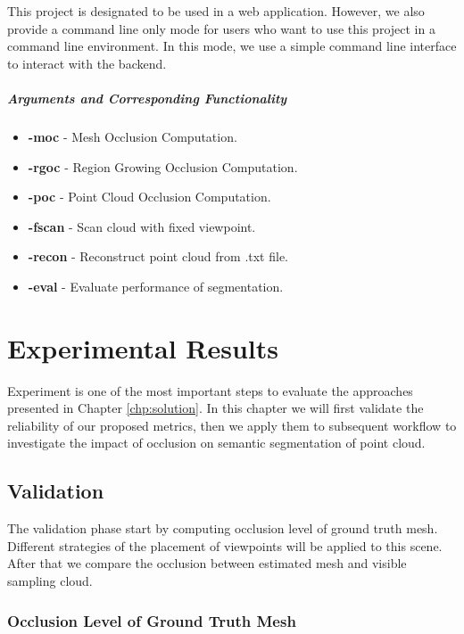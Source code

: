 \documentclass[11pt, a4paper,oneside,chapterprefix=false]{scrbook}
\begin{document}
This project is designated to be used in a web application. However, we also provide a command line only mode for users who want to use this project in a command line environment. In this mode, we use a simple command line interface to interact with the backend.

\paragraph{Arguments and Corresponding Functionality}

\begin{itemize}
	\item \textbf{-moc} - Mesh Occlusion Computation.
	\item \textbf{-rgoc} - Region Growing Occlusion Computation.
	\item \textbf{-poc} - Point Cloud Occlusion Computation.
	\item \textbf{-fscan} - Scan cloud with fixed viewpoint.
	\item \textbf{-recon} - Reconstruct point cloud from .txt file.
	\item \textbf{-eval} - Evaluate performance of segmentation.
\end{itemize}


\chapter{Experimental Results} \label{chp:experimental results}

Experiment is one of the most important steps to evaluate the approaches presented in Chapter \ref{chp:solution}. In this chapter we will first validate the reliability of our proposed metrics, then we apply them to subsequent workflow to investigate the impact of occlusion on semantic segmentation of point cloud.

\section{Validation}

The validation phase start by computing occlusion level of ground truth mesh. Different strategies of the placement of viewpoints will be applied to this scene. After that we compare the occlusion between estimated mesh and visible sampling cloud.

\subsection{Occlusion Level of Ground Truth Mesh} \label{exp:occlusion of ground truth mesh}
\end{document}
